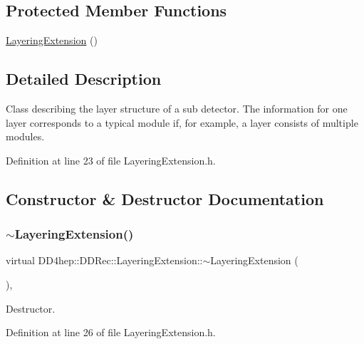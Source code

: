 \subsection*{Protected Member Functions}
\begin{DoxyCompactItemize}
\item 
\hyperlink{class_d_d4hep_1_1_d_d_rec_1_1_layering_extension_abea54214401d949b2b3313e0c1d448af}{Layering\+Extension} ()
\end{DoxyCompactItemize}


\subsection{Detailed Description}
Class describing the layer structure of a sub detector. The information for one layer corresponds to a typical module if, for example, a layer consists of multiple modules. 

Definition at line 23 of file Layering\+Extension.\+h.



\subsection{Constructor \& Destructor Documentation}
\hypertarget{class_d_d4hep_1_1_d_d_rec_1_1_layering_extension_aab6b9c7fe676917e07c53cffbdd87767}{}\label{class_d_d4hep_1_1_d_d_rec_1_1_layering_extension_aab6b9c7fe676917e07c53cffbdd87767} 
\subsubsection{\texorpdfstring{$\sim$\+Layering\+Extension()}{~LayeringExtension()}}
{\footnotesize\ttfamily virtual D\+D4hep\+::\+D\+D\+Rec\+::\+Layering\+Extension\+::$\sim$\+Layering\+Extension (\begin{DoxyParamCaption}{ }\end{DoxyParamCaption})\hspace{0.3cm}{\ttfamily [inline]}, {\ttfamily [virtual]}}



Destructor. 



Definition at line 26 of file Layering\+Extension.\+h.



